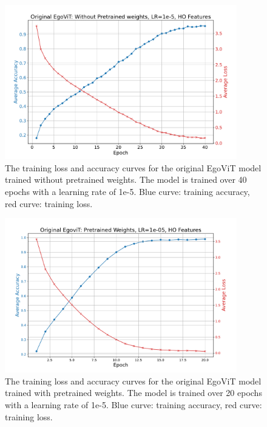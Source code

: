 \begin{figure}[b]
    \centering
    \includegraphics[width=0.9\textwidth]{graphics/figure11}
    \caption{The training loss and accuracy curves for the original EgoViT model trained without pretrained weights. The model is trained over 40 epochs with a learning rate of 1e-5. Blue curve: training accuracy, red curve: training loss.}
    \label{fig:orig-EgoViT}
\end{figure}
\clearpage
\begin{figure}[htbp]  
    \centering
    \includegraphics[width=0.9\textwidth]{graphics/figure31}
    \caption{The training loss and accuracy curves for the original EgoViT model trained with pretrained weights. The model is trained over 20 epochs with a learning rate of 1e-5. Blue curve: training accuracy, red curve: training loss.}
    \label{fig:orig-EgoViT-with-pretrained}
\end{figure}
\vspace{3mm}
